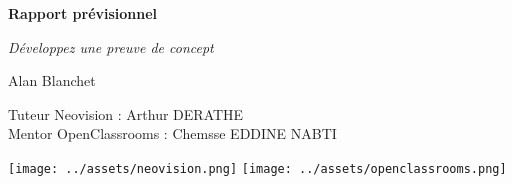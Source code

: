 \begin{titlepage}
    

    \begin{center}
        \vspace*{5cm}

        \Huge
        \textbf{Rapport prévisionnel}

        \LARGE
        {\it Développez une preuve de concept}

        \vspace{1cm}

        \Large
        Alan Blanchet

        \vspace{4cm}

        \begin{center}
            Tuteur Neovision : Arthur DERATHE\\
            Mentor OpenClassrooms : Chemsse EDDINE NABTI
        \end{center}

        \vfill

        \texttt{[image: ../assets/neovision.png]}
        \hspace{1cm}
        \texttt{[image: ../assets/openclassrooms.png]}
    \end{center}

    \newpage
\end{titlepage}